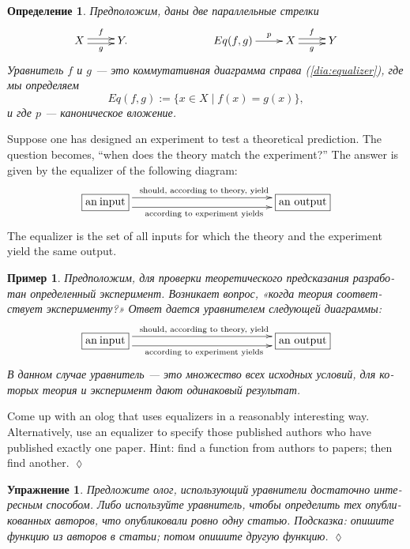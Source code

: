 \documentclass[a4paper]{book}
\def\tn{\textnormal}
\def\|{{\;|\;}}
\newcommand{\obox}[3]{\stackrel{#1}{\fbox{\parbox{#2}{#3}}}}
\theoremstyle{myth}
\newtheorem{exampleENG}[envENG]{\begin{english}Example\end{english}}
\newtheorem{excENG}[envENG]{\begin{english}Exercise\end{english}}
\newenvironment{exerciseENG}{\begin{excENG}}{\hspace*{\fill}$\lozenge$\end{excENG}}
\newtheorem{exampleRUS}[envRUS]{Пример}
\newtheorem{excRUS}[envRUS]{Упражнение}
\newtheorem{definitionRUS}[envRUS]{Определение}
\newenvironment{exerciseRUS}{\begin{excRUS}}{\hspace*{\fill}$\lozenge$\end{excRUS}}
\begin{document}
\begin{russian}
\begin{definitionRUS}\label{def:equalizer}
Предположим, даны две параллельные стрелки
\begin{align}\label{dia:equalizer}
\xymatrix{X\ar@<.5ex>[r]^f\ar@<-.5ex>[r]_g&Y.}\hspace{1in}\xymatrix{Eq(f,g)\ar[r]^-p&X\ar@<.5ex>[r]^f\ar@<-.5ex>[r]_g&Y}
\end{align}
{\em Уравнитель $f$ и $g$} — это коммутативная диаграмма справа (\ref{dia:equalizer}), где мы определяем $$Eq(f,g):=\{x\in X\|f(x)=g(x)\},$$ и где  $p$ — каноническое вложение.
\end{definitionRUS}

\begin{exampleENG}
Suppose one has designed an experiment to test a theoretical prediction. The question becomes, “when does the theory match the experiment?” The answer is given by the equalizer of the following diagram:
$$\xymatrix{
\obox{}{.5in}{an input}\ar@<1ex>[rr]^{\tn{should, according to theory, yield}}\ar@<-1ex>[rr]_{\tn{according to experiment yields}}&\hspace{1in}&\obox{}{.6in}{an output}
}$$
The equalizer is the set of all inputs for which the theory and the experiment yield the same output.
\end{exampleENG}

\begin{exampleRUS}
Предположим, для проверки теоретического предсказания разработан определенный эксперимент. Возникает вопрос, «когда теория соответствует эксперименту?» Ответ дается уравнителем следующей диаграммы:
$$\xymatrix{
\obox{}{.5in}{an input}\ar@<1ex>[rr]^{\tn{should, according to theory, yield}}\ar@<-1ex>[rr]_{\tn{according to experiment yields}}&\hspace{1in}&\obox{}{.6in}{an output}
}$$
В данном случае уравнитель — это множество всех исходных условий, для которых теория и эксперимент дают одинаковый результат.
\end{exampleRUS}

\begin{exerciseENG}
Come up with an olog that uses equalizers in a reasonably interesting way. Alternatively, use an equalizer to specify those published authors who have published exactly one paper. Hint: find a function from authors to papers; then find another.
\end{exerciseENG}

\begin{exerciseRUS}
Предложите олог, использующий уравнители достаточно интересным способом. Либо используйте уравнитель, чтобы определить тех опубликованных авторов, что опубликовали ровно одну статью. Подсказка: опишите функцию из авторов в статьи; потом опишите другую функцию.
\end{exerciseRUS}


\end{russian}
\end{document}
